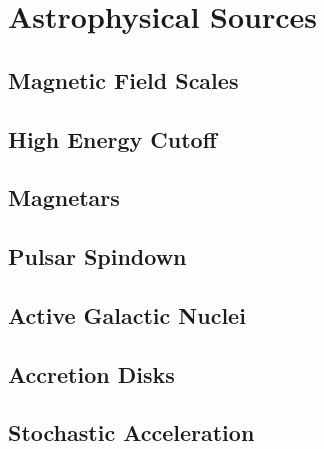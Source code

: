 \section{Astrophysical Sources}
\label{sec:sources}



\subsection{Magnetic Field Scales}
\label{sub:fields}



\subsection{High Energy Cutoff}
\label{sub:cutoff}



\subsection{Magnetars}
\label{sub:magnetars}



\subsection{Pulsar Spindown}
\label{sub:spindown}



\subsection{Active Galactic Nuclei}
\label{sub:nuclei}



\subsection{Accretion Disks}
\label{sub:accretion}



\subsection{Stochastic Acceleration}
\label{sub:acceleration}
